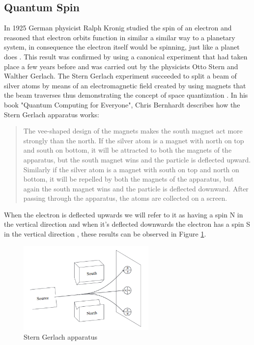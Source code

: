 \documentclass[12pt,a4paper]{scrartcl}
\begin{document}
\subsection{Quantum Spin}\label{ss:quantum_spin}
In 1925 German physicist Ralph Kronig studied the spin of an electron and reasoned that electron orbits function in similar a similar way to a planetary system, in consequence the electron itself would be spinning, just like a planet does \cite{Longair2013}. This result was confirmed by using a canonical experiment that had taken place a few years before and was carried out by the physicists Otto Stern and Walther Gerlach. The Stern Gerlach experiment succeeded to split a beam of silver atoms by means of an electromagnetic field created by using magnets that the beam traverses thus demonstrating the concept of space quantization \cite{Friedrich2003}. 
In his book "Quantum Computing for Everyone", Chris Bernhardt describes how the Stern Gerlach apparatus works:
\begin{quote}
    The  vee-shaped  design  of  the  magnets  makes  the  south  magnet  act  more strongly than the north. If the silver atom is a magnet with north on top and south on bottom, it will be attracted to both the magnets of the apparatus, but the south magnet wins and the particle is deflected upward. Similarly if the silver atom is a magnet with south on top and north on bottom, it will be repelled by both the magnets of the apparatus, but again the south  magnet  wins  and  the  particle  is  deflected  downward.  After  passing  through the apparatus, the atoms are collected on a screen. \cite{bernhardt2019quantum}
\end{quote}
When the electron is deflected upwards we will refer to it as having a spin N in the vertical direction and when it's deflected downwards the electron has a spin S in the vertical direction \cite{bernhardt2019quantum}, these results can be observed in Figure \ref{fig:stern-gerlach-apparatus}. \\

\begin{figure}[ht]
    \centering
    \includegraphics[width=0.6\textwidth]{images/1-Stern_Gerlach_Apparatus.png}
    \caption{Stern Gerlach apparatus \cite{bernhardt2019quantum}}
    \label{fig:stern-gerlach-apparatus}
\end{figure}
\end{document}
